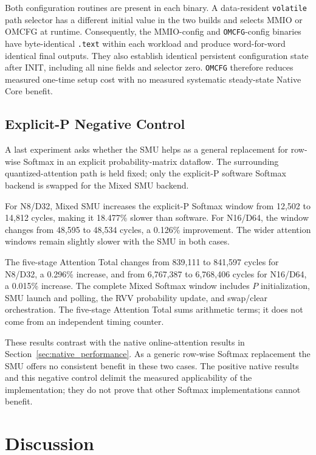 \documentclass[journal]{IEEEtran}
\begin{document}
Both configuration routines are present in each binary. A data-resident
\texttt{volatile} path selector has a different initial value in the two
builds and selects MMIO or OMCFG at runtime. Consequently, the
MMIO-config and \texttt{OMCFG}-config binaries have byte-identical \texttt{.text}
within each workload and produce word-for-word identical final outputs. They
also establish identical persistent configuration state after INIT, including
all nine fields and selector zero. \texttt{OMCFG} therefore reduces measured
one-time setup cost with no measured systematic steady-state Native Core
benefit.

\subsection{Explicit-P Negative Control}
A last experiment asks whether the SMU helps as a general replacement for
row-wise Softmax in an explicit probability-matrix dataflow. The surrounding
quantized-attention path is held fixed; only the explicit-P software Softmax
backend is swapped for the Mixed SMU backend.

For N8/D32, Mixed SMU increases the explicit-P Softmax window from 12,502 to
14,812 cycles, making it 18.477\% slower than software. For N16/D64, the
window changes from 48,595 to 48,534 cycles, a 0.126\% improvement. The wider
attention windows remain slightly slower with the SMU in both cases.

The five-stage Attention Total changes from 839,111 to 841,597 cycles for
N8/D32, a 0.296\% increase, and from 6,767,387 to 6,768,406 cycles for
N16/D64, a 0.015\% increase. The complete Mixed Softmax window includes $P$
initialization, SMU launch and polling, the RVV probability update, and
swap/clear orchestration. The five-stage Attention Total sums arithmetic terms;
it does not come from an independent timing counter.

These results contrast with the native online-attention results in
Section~\ref{sec:native_performance}. As a generic row-wise Softmax replacement the SMU offers no
consistent benefit in these two cases. The positive native results and this
negative control delimit the measured applicability of the implementation;
they do not prove that other Softmax implementations cannot benefit.

\section{Discussion}
\label{sec:discussion}
\end{document}
